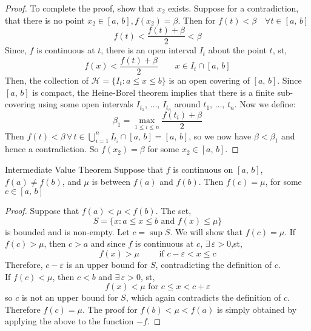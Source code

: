 \documentclass{article}
\renewcommand{\b}{\beta}
\newcommand{\e}{\varepsilon}
\newcommand{\ex}{\exists\,}
\begin{document}
{{{{\begin{proof}
  \noindent
  To complete the proof, show that $x_2$ exists. Suppose for a contradiction, that there is no point $x_2 \in [a,\,b], f(x_2) = \b$. Then for $f(t) < \b\quad \forall t \in [a,\,b]$
  $$ f(t) < \frac{f(t) + \b}{2} < \b $$
  Since, $f$ is continuous at $t$, there is an open interval $I_t$ about the point $t$, st,
  $$ f(x) < \frac{f(t) + \b}{2} \qquad x\in I_t\cap[a,\, b] $$
  Then, the collection of $\displaystyle{\mathcal{H} = \{ I_t: a\le x \le b\}}$ is an open covering of $[a, \, b]$. Since $[a, \, b]$ is compact, the Heine-Borel theorem implies that there is a finite sub-covering using some open intervals $I_{t_1},\,\dots,\,I_{t_n}$ around $t_1,\,\dots,\,t_n$. Now we define:
  $$ \b_1 = \max_{1\le i \le n}{\frac{f(t_i) + \b}{2}} $$
  Then $f(t) < \b \,\forall \,t \in \bigcup_{i=1}^n{I_{t_i}\cap[a,\,b]} = [a,\,b]$, so we now have $\b <\b_1$ and hence a contradiction. So $f(x_2) = \b$ for some $x_2\in [a,\,b]$.
\end{proof}
\begin{figure}[H]
  \centering
\end{figure}
\begin{theorem}{Intermediate Value Theorem}{}
  Suppose that $f$ is continuous on $[a,\, b]$, $f(a)\neq f(b)$, and $\mu$ is between $f(a)$ and $f(b)$. Then $f(c) = \mu$, for some $c\in [a,\, b]$
\end{theorem}
\begin{proof}
  Suppose that $f(a) < \mu < f(b)$. The set,
  $$ S = \{ x : a \le x \le b \text{ and }f(x)\le\mu  \} $$
  is bounded and is non-empty. Let $c = \sup S$. We will show that $f(c) = \mu$. If $f(c) > \mu$, then $c > a$ and since $f$ is continuous at $c$, $\ex\e>0$,st,
  $$ f(x) > \mu \qquad\text{ if }c - \e < x \le c $$
  Therefore, $c - \e$ is an upper bound for $S$, contradicting the definition of $c$.\\
  If $f(c) < \mu$, then $c < b$ and $\ex\e>0$, st,
  $$ f(x) < \mu \text{ for } c \le x < c + \e $$
  so $c$ is not an upper bound for $S$, which again contradicts the definition of $c$. \\
  Therefore $f(c) = \mu$. The proof for $f(b) < \mu < f(a)$ is simply obtained by applying the above to the function $-f$.
\end{proof}

}}}}
\end{document}
